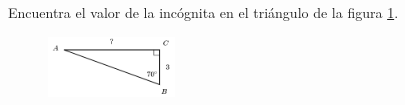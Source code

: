 \question[15]  Encuentra el valor de la incógnita en el triángulo de la figura \ref{fig:lados_functrig_22}.
\begin{figure}[H]
    \begin{center}
        \includegraphics[width=0.3\textwidth]{../images/lados_functrig_22.png}
    \end{center}
    \caption{}
    \label{fig:lados_functrig_22}
\end{figure}